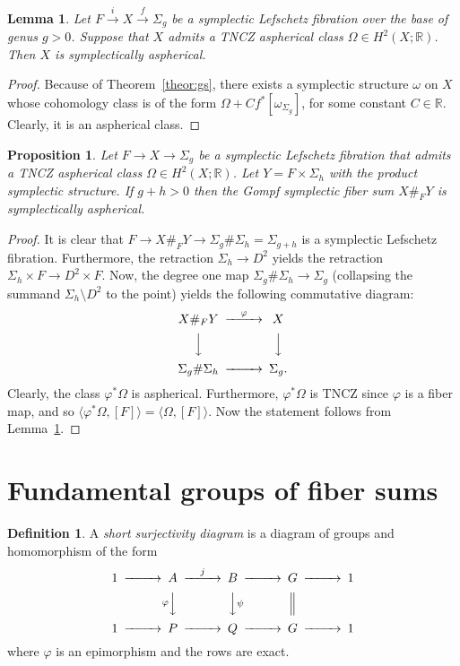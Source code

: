 \documentclass[12pt]{amsart}
\newcommand{\B}[1]{{\mathbb #1}}
\newcommand{\R}{\B R}
\newtheorem{lemma}[subsection]{Lemma}
\newtheorem{prop}[subsection]{Proposition}
\theoremstyle{definition}
\newtheorem{definition}[subsection]{Definition}
\theoremstyle{remark}
\numberwithin{figure}{section}
\numberwithin{table}{section}
\numberwithin{equation}{section}
\newcommand{\Om}{{\Omega}}
\newcommand{\om}{{\omega}}
\newcommand{\la}{{\lambda}}
\newcommand{\Si}{{\Sigma}}
\newcommand{\gf}{\varphi}
\def\la{\langle}
\def\ra{\rangle}
\newcommand\theoref{Theorem~\ref}
\newcommand\lemref{Lemma~\ref}
\begin{document}
\begin{lemma}\label{L:fac} Let $F\stackrel{i}\to X  \stackrel{f}\to \Si_g$ be a symplectic 
Lefschetz fibration over the base of genus $g>0$. Suppose that  
$X$ admits a TNCZ aspherical class $\Om\in H^2(X;\R)$. Then 
$X$ is symplectically aspherical.  
\end{lemma} 

\begin{proof} 
Because of \theoref{theor:gs}, there exists a symplectic 
structure $\om$ on $X$ whose cohomology class is of the 
form $\Om + C f^*[\om_{\Si_g}]$, for some constant $C\in \B R$.  
Clearly, it is an aspherical class. 
\end{proof} 

\begin{prop}\label{p:sum}Let $F\to X \to \Si_g$ be a symplectic Lefschetz fibration 
that admits a TNCZ aspherical class $\Omega\in H^2(X;\R)$. Let $Y =F\times \Si_h$ with the product
symplectic structure. If $g+h>0$ then the Gompf symplectic
fiber sum $X \#_F Y$ is symplectically aspherical.
\end{prop}

\begin{proof}
It is clear that $F \to X \#_F Y\to \Sigma_g \# \Sigma_h = \Sigma_{g+h}$
is a symplectic Lefschetz fibration.
Furthermore, the retraction $\Si_h \to D^2$ yields the retraction 
$\Si_h\times F \to D^2\times F$.
Now, the degree one map
$\Sigma_g\# \Sigma_h \to \Sigma_g$ (collapsing the summand $\Sigma_h \setminus D^2$
to the point) yields the following commutative diagram:
$$
\CD
X\#_{F} Y @>\gf>> X\\
@VVV @VVV\\
\Si_g\#\Si_h @>>> \Si_g.
\endCD
$$
Clearly, the class $\gf^*\Omega$ is aspherical. Furthermore,  $\gf^*\Omega$ is TNCZ 
since $\gf$ is a fiber map, and so $\la \gf^*\Omega, [F]\ra=\la \Omega, [F]\ra$. Now 
the statement follows from \lemref{L:fac}. 
\end{proof}




\section{Fundamental groups of fiber sums}\label{S:fibersum} 



\begin{definition}
A {\em short surjectivity diagram} is a diagram of groups and homomorphism of 
the form
%
\begin{equation}\label{eq:ssd}
\CD
1 @>>> A @ >j>> B @>>> G @>>> 1\\
@. @V\gf VV @VV \psi V @| @.\\
1 @>>> P @ >>> Q @>>> G @>>> 1
\endCD
\end{equation}
%
where $\gf$ is an epimorphism and the rows are exact.
\end{definition}
\end{document}
